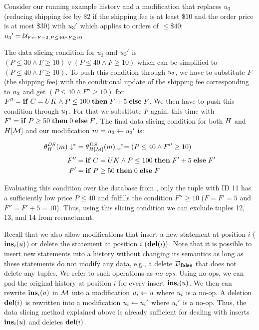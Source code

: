 \begin{exam}\label{ex:ds-example}
Consider our running example history and a modification that replaces $u_3$ (reducing shipping fee by \$2 if the shipping fee is at least \$10 and the order price is at most \$30) with ${u_3}'$ which applies to orders of $\leq \$40$: ${u_3}' = \mathcal{U}_{F \gets F-2,P \leq 40 \land F \geq 10}$.





The data slicing condition for $u_3$ and ${u_3}'$ is $(P \leq 30 \land F \geq 10) \vee (P \leq 40 \land F \geq 10)$ which can be simplified to $(P \leq 40 \land F \geq 10)$. To push this condition through $u_2$, we have to substitute $F$ (the shipping fee) with the conditional update of the shipping fee corresponding to $u_2$ and get
$(P \leq 40 \land F'' \geq 10)$ for $F'' = \mathbf{if}\thickspace C=UK \land P \leq 100 \thickspace \mathbf{then} \thickspace F+5 \thickspace \mathbf{else} \thickspace F$. We then have to push this condition through $u_1$. For that we substitute $F$ again, this time with $F' = \mathbf{if}\thickspace P \geq 50 \thickspace \mathbf{then} \thickspace 0 \thickspace \mathbf{else} \thickspace F$. The final data slicing condition for both $H$ and $H[\mathcal{M}]$ and our modification $m = u_3 \gets {u_3}'$ is:


\begin{align*}
{\theta_{H}^{DS}(m)}\downarrow^{\ast} &= {\theta_{H[\mathcal{M}]}^{DS}(m)}\downarrow^{\ast} = (P \leq 40 \land F'' \geq 10)\\[1mm]
F'' &= \mathbf{if}\thickspace C=UK \land P \leq 100 \thickspace \mathbf{then} \thickspace F'+5 \thickspace \mathbf{else} \thickspace F'\\
  F' &= \mathbf{if}\thickspace P \geq 50 \thickspace \mathbf{then} \thickspace 0 \thickspace \mathbf{else} \thickspace F
\end{align*}

Evaluating this condition over the database from , only the tuple with ID 11 has a sufficiently low price $P \leq 40$ and fulfills the condition $F'' \geq 10$ ($F = F' = 5$ and $F'' = F'+5 = 10$). Thus, using this slicing condition we can exclude tuples 12, 13, and 14 from reenactment.










\end{exam}





Recall that we also allow modifications that insert a new statement at position $i$ ($\mathbf{ins}_{i}(u)$) or delete the statement at position $i$ ($\mathbf{del}(i))$. Note that it is possible to insert new statements into a history without changing its semantics as long as these statements do not modify any data, e.g., a delete $\mathcal{D}_{\mathbf{false}}$ that does not delete any tuples. We refer to such operations as \emph{no-ops}. Using no-ops, we can pad the original history at position $i$ for every insert $\mathbf{ins}_{i}(u)$. We then can rewrite  $\mathbf{ins}_{i}(u)$ in $\mathcal{M}$ into a modification $u_i \gets u$ where $u_i$ is a no-op. A deletion $\mathbf{del}(i)$ is rewritten into a modification $u_i \gets {u_i}'$ where ${u_i}'$ is a no-op. Thus, the data slicing method explained above is already sufficient for dealing with inserts $\mathbf{ins}_{i}(u)$ and deletes $\mathbf{del}(i)$.


